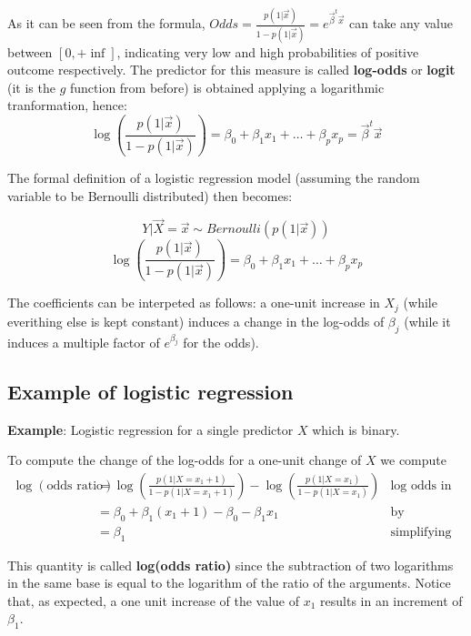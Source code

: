	As it can be seen from the formula, $Odds = \frac{p(1|\vec{x})}{1 -
p(1|\vec{x})} = e^{\vec{\beta}^t\vec{x}} $ can take any value between $[0,
+\inf]$, indicating very low and high probabilities of positive outcome
respectively. The predictor for this measure is called \textbf{log-odds} or
\textbf{logit} (it is the $g$ function from before) is obtained applying a
logarithmic tranformation, hence:
    $$
    \log\left(\frac{p(1|\vec{x})}{1 - p(1|\vec{x})}\right) 
    = \beta_0 + \beta_1 x_1 + \dots + \beta_px_p 
    = \vec{\beta}^t\vec{x}
    $$
    
    The formal definition of a logistic regression model (assuming the random
    variable to be Bernoulli distributed) then becomes:

    $$Y|\vec{X} = \vec{x} \sim Bernoulli(p(1|\vec{x}))$$
    $$\log\left(\frac{p(1|\vec{x})}{1 - p(1|\vec{x})}\right) = \beta_0 + \beta_1
    x_1 + \dots + \beta_px_p $$
    
    The coefficients can be interpeted as follows: a one-unit increase in $X_j$
    (while everithing else is kept constant) induces a change in the log-odds of
    $\beta_j$ (while it induces a multiple factor of $e^{\beta_j}$ for the
    odds).

    \subsection{Example of logistic regression}
    \textbf{Example}: Logistic regression for a single predictor $X$ which is
    binary.

    To compute the change of the log-odds for a one-unit change of $X$ we
    compute
    \begin{align*}
    \log(\text{odds ratio})
      & = \log\left(\frac{p(1|X=x_1+1)}{1-p(1|X=x_1+1)}\right)-\log\left(\frac{p(1|X=x_1)}{1-p(1|X=x_1)}\right)
      & \text{log odds in 1 minus log odds in 0}\\
      & = \beta_0 + \beta_1 (x_1 + 1) - \beta_0 - \beta_1x_1 
      & \text{by definition of logistic regression}\\
      & = \beta_1
      & \text{simplifying}
\end{align*}
 
    This quantity is called \textbf{log(odds ratio)} since the subtraction of
    two logarithms in the same base is equal to the logarithm of the ratio of
    the arguments. Notice that, as expected, a one unit increase of the value of
    $x_1$ results in an increment of \textbf{$\beta_1$}.

